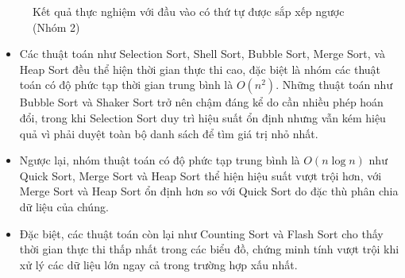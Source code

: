 \begin{figure}[H]
\caption{Kết quả thực nghiệm với đầu vào có thứ tự được sắp xếp ngược (Nhóm 2)}
\end{figure}

\begin{itemize}[label=$\circ$]
    \item Các thuật toán như Selection Sort, Shell Sort, Bubble Sort, 
    Merge Sort, và Heap Sort đều thể hiện thời gian thực thi cao, đặc 
    biệt là nhóm các thuật toán có độ phức tạp thời gian trung bình là 
    $O\left(n^2\right)$. Những thuật toán như Bubble Sort và Shaker Sort 
    trở nên chậm đáng kể do cần nhiều phép hoán đổi, trong khi Selection 
    Sort duy trì hiệu suất ổn định nhưng vẫn kém hiệu quả vì phải duyệt 
    toàn bộ danh sách để tìm giá trị nhỏ nhất.
    \item Ngược lại, nhóm thuật toán có độ phức tạp trung bình là 
    $O\left(n\log{n}\right)$ như Quick Sort, Merge Sort và Heap Sort thể 
    hiện hiệu suất vượt trội hơn, với Merge Sort và Heap Sort ổn định hơn 
    so với Quick Sort do đặc thù phân chia dữ liệu của chúng.
    \item Đặc biệt, các thuật toán còn lại như Counting Sort và Flash 
    Sort cho thấy thời gian thực thi thấp nhất trong các biểu đồ, chứng 
    minh tính vượt trội khi xử lý các dữ liệu lớn ngay cả trong trường 
    hợp xấu nhất.
\end{itemize}

